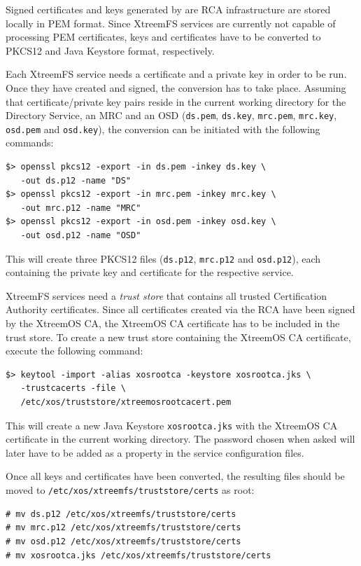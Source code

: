 \documentclass[a4paper,10pt]{book}
\begin{document}
Signed certificates and keys generated by are RCA infrastructure are stored locally in PEM format. Since XtreemFS services are currently not capable of processing PEM certificates, keys and certificates have to be converted to PKCS12 and Java Keystore format, respectively.

Each XtreemFS service needs a certificate and a private key in order to be run. Once they have created and signed, the conversion has to take place. Assuming that certificate/private key pairs reside in the current working directory for the Directory Service, an MRC and an OSD (\texttt{ds.pem}, \texttt{ds.key}, \texttt{mrc.pem}, \texttt{mrc.key}, \texttt{osd.pem} and \texttt{osd.key}), the conversion can be initiated with the following commands:


\begin{verbatim}
$> openssl pkcs12 -export -in ds.pem -inkey ds.key \
   -out ds.p12 -name "DS"
$> openssl pkcs12 -export -in mrc.pem -inkey mrc.key \
   -out mrc.p12 -name "MRC"
$> openssl pkcs12 -export -in osd.pem -inkey osd.key \
   -out osd.p12 -name "OSD"
\end{verbatim}

This will create three PKCS12 files (\texttt{ds.p12}, \texttt{mrc.p12} and \texttt{osd.p12}), each containing the private key and certificate for the respective service.

XtreemFS services need a \textit{trust store} that contains all trusted Certification Authority certificates. Since all certificates created via the RCA have been signed by the XtreemOS CA, the XtreemOS CA certificate has to be included in the trust store. To create a new trust store containing the XtreemOS CA certificate, execute the following command:


\begin{verbatim}
$> keytool -import -alias xosrootca -keystore xosrootca.jks \
   -trustcacerts -file \
   /etc/xos/truststore/xtreemosrootcacert.pem
\end{verbatim}

This will create a new Java Keystore \texttt{xosrootca.jks} with the XtreemOS CA certificate in the current working directory. The password chosen when asked will later have to be added as a property in the service configuration files.

Once all keys and certificates have been converted, the resulting files should be moved to \texttt{/etc/xos/xtreemfs/truststore/certs} as root:


\begin{verbatim}
# mv ds.p12 /etc/xos/xtreemfs/truststore/certs
# mv mrc.p12 /etc/xos/xtreemfs/truststore/certs
# mv osd.p12 /etc/xos/xtreemfs/truststore/certs
# mv xosrootca.jks /etc/xos/xtreemfs/truststore/certs
\end{verbatim}
\end{document}
